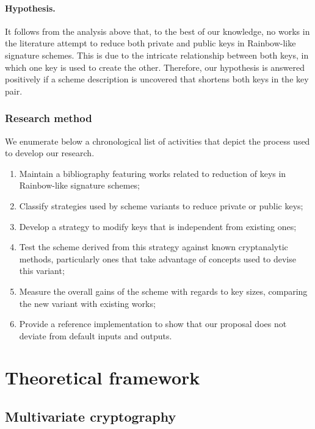 \documentclass[openright]{report}
\begin{document}
\subsubsection{Hypothesis.} It follows from the analysis above that, to the best of our knowledge, no works in the literature attempt to reduce both private and public keys in Rainbow-like signature schemes. This is due to the intricate relationship between both keys, in which one key is used to create the other. Therefore, our hypothesis is answered positively if a scheme description is uncovered that shortens both keys in the key pair.

\subsection{Research method}

We enumerate below a chronological list of activities that depict the process used to develop our research.

\begin{enumerate}[label=(\roman*), itemsep=1pt]
    \item Maintain a bibliography featuring works related to reduction of keys in Rainbow-like signature schemes;
    \item Classify strategies used by scheme variants to reduce private or public keys;
    \item Develop a strategy to modify keys that is independent from existing ones;
    \item Test the scheme derived from this strategy against known cryptanalytic methods, particularly ones that take advantage of concepts used to devise this variant;
    \item Measure the overall gains of the scheme with regards to key sizes, comparing the new variant with existing works;
    \item Provide a reference implementation to show that our proposal does not deviate from default inputs and outputs.
\end{enumerate}

\chapter{Theoretical framework}

\section{Multivariate cryptography}
\end{document}
